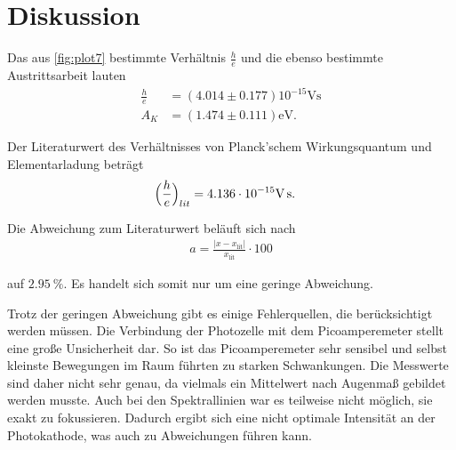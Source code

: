 \section{Diskussion}
\label{sec:Diskussion}

Das aus \autoref{fig:plot7} bestimmte Verhältnis $\frac{h}{e}$ und die ebenso bestimmte Austrittsarbeit lauten
\begin{align*}
    \frac{h}{e} &= (4.014 \pm 0.177) 10^{-15} \si{\volt\second} \\
    A_K &=  (1.474 \pm 0.111) \si{\electronvolt}.
\end{align*}

Der Literaturwert des Verhältnisses von Planck'schem Wirkungsquantum\cite{Planck} und Elementarladung\cite{Elementarladung} beträgt
\begin{align*}
    \Bigl(\frac{h}{e}\Bigr)_{lit} &= 4.136 \cdot 10^{-15} \si{\volt\second}.
\end{align*}

Die Abweichung zum Literaturwert beläuft sich nach
\begin{align*}
    a=\frac{|x-x_{\text{lit}}|}{x_{\text{lit}}}\cdot 100 \label{eqn:abweich}
\end{align*}

auf $\qty{2.95}{\percent}$. Es handelt sich somit nur um eine geringe Abweichung.

Trotz der geringen Abweichung gibt es einige Fehlerquellen, die berücksichtigt werden müssen.
Die Verbindung der Photozelle mit dem Picoamperemeter stellt eine große Unsicherheit dar.
So ist das Picoamperemeter sehr sensibel und selbst kleinste Bewegungen im Raum führten zu starken Schwankungen.
Die Messwerte sind daher nicht sehr genau, da vielmals ein Mittelwert nach Augenmaß gebildet werden musste.
Auch bei den Spektrallinien war es teilweise nicht möglich, sie exakt zu fokussieren. Dadurch ergibt sich eine nicht optimale Intensität
an der Photokathode, was auch zu Abweichungen führen kann.